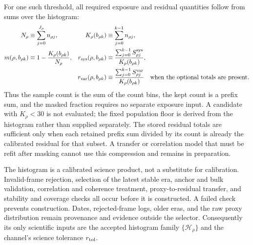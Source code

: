 For one such threshold, all required exposure and residual quantities follow from sums over the histogram:
\begin{align}
N_\rho &\equiv \sum_{j=0}^{J_\rho} n_{\rho j},
&K_\rho(b_{\rho k})&\equiv\sum_{j=0}^{k-1}n_{\rho j},\\
m(\rho,b_{\rho k})&\equiv1-\frac{K_\rho(b_{\rho k})}{N_\rho},
&r_{\rm sys}(\rho,b_{\rho k})&\equiv
\frac{\sum_{j=0}^{k-1}S^{\rm sys}_{\rho j}}
{K_\rho(b_{\rho k})},\\
&&r_{\rm var}(\rho,b_{\rho k})&\equiv
\frac{\sum_{j=0}^{k-1}S^{\rm var}_{\rho j}}
{K_\rho(b_{\rho k})}\quad\text{when the optional totals are present}.
\end{align}
Thus the sample count is the sum of the count bins, the kept count is a prefix sum, and the masked fraction requires no separate exposure input. A candidate with $K_\rho<30$ is not evaluated; the fixed population floor is derived from the histogram rather than supplied separately. The stored residual totals are sufficient only when each retained prefix sum divided by its count is already the calibrated residual for that subset. A transfer or correlation model that must be refit after masking cannot use this compression and remains in preparation.

The histogram is a calibrated science product, not a substitute for calibration. Invalid-frame rejection, selection of the latest stable era, anchor and bulk validation, correlation and coherence treatment, proxy-to-residual transfer, and stability and coverage checks all occur before it is constructed. A failed check prevents construction. Dates, rejected-frame logs, older eras, and the raw proxy distribution remain provenance and evidence outside the selector. Consequently its only scientific inputs are the accepted histogram family $\{\mathcal H_\rho\}$ and the channel's science tolerance $r_{\rm tol}$.

